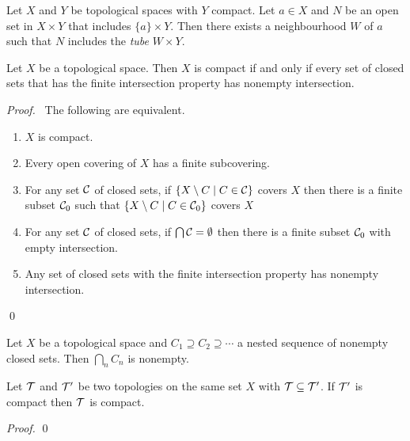 \begin{corollary}
    Let $X$ and $Y$ be topological spaces with $Y$ compact. Let $a \in X$
    and $N$ be an open set in $X \times Y$ that includes $\{a\} \times Y$.
    Then there exists a neighbourhood $W$ of $a$ such that
    $N$ includes the \emph{tube} $W \times Y$.
\end{corollary}

\begin{theorem}
    \label{theorem:compact_closed_sets}
    Let $X$ be a topological space. Then $X$ is compact if and only if every set of closed sets that has the finite intersection property has nonempty intersection.
\end{theorem}

\begin{proof}
    \pf\ The following are equivalent.
    \begin{enumerate}
        \item $X$ is compact.
        \item Every open covering of $X$ has a finite subcovering.
        \item For any set $\mathcal{C}$ of closed sets, if $\{ X \setminus C \mid C \in \mathcal{C} \}$ covers $X$ then there is a finite subset $\mathcal{C}_0$ such that
        $\{ X \setminus C \mid C \in \mathcal{C}_0 \}$ covers $X$
        \item For any set $\mathcal{C}$ of closed sets, if $\bigcap \mathcal{C} = \emptyset$ then there is a finite subset $\mathcal{C}_0$ with empty intersection.
        \item Any set of closed sets with the finite intersection property has nonempty intersection.
    \end{enumerate}
    \qed
\end{proof}

\begin{corollary}
    \label{corollary:nested_intersection}
    Let $X$ be a topological space and $C_1 \supseteq C_2 \supseteq \cdots$ a nested sequence of nonempty closed sets. Then $\bigcap_n C_n$ is nonempty.
\end{corollary}

\begin{proposition}
    Let $\mathcal{T}$ and $\mathcal{T}'$ be two topologies on the same set $X$ with $\mathcal{T} \subseteq \mathcal{T}'$. If $\mathcal{T}'$ is compact then $\mathcal{T}$ is compact.
\end{proposition}

\begin{proof}
    \pf
    \qed
\end{proof}

